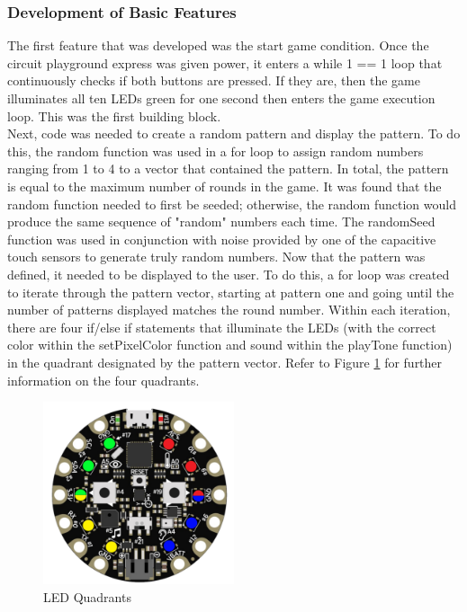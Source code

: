 \documentclass[12pt]{article}
\begin{document}
\subsubsection{Development of Basic Features}
The first feature that was developed was the start game condition. Once the circuit playground express was given power, it enters a while 1 == 1 loop that continuously checks if both buttons are pressed. If they are, then the game illuminates all ten LEDs green for one second then enters the game execution loop. This was the first building block.
\vspace*{0.5cm}
\\
Next, code was needed to create a random pattern and display the pattern. To do this, the random function was used in a for loop to assign random numbers ranging from 1 to 4 to a vector that contained the pattern. In total, the pattern is equal to the maximum number of rounds in the game. It was found that the random function needed to first be seeded; otherwise, the random function would produce the same sequence of "random" numbers each time. The randomSeed function was used in conjunction with noise provided by one of the capacitive touch sensors to generate truly random numbers. Now that the pattern was defined, it needed to be displayed to the user. To do this, a for loop was created to iterate through the pattern vector, starting at pattern one and going until the number of patterns displayed matches the round number. Within each iteration, there are four if/else if statements that illuminate the LEDs (with the correct color within the setPixelColor function and sound within the playTone function) in the quadrant designated by the pattern vector. Refer to Figure \ref{fig:LED_Quadrants} for further information on the four quadrants. 
\begin{figure}[]
    \centering
    \includegraphics[width = 0.5\textwidth]{Correct_LEDs.png}
    \caption{LED Quadrants}
    \label{fig:LED_Quadrants}
\end{figure}
\end{document}
